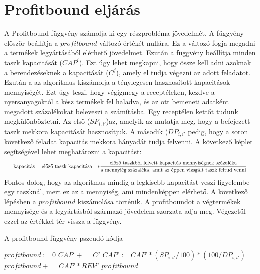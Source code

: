 \section{Profitbound eljárás}
A Profitbound függvény számolja ki egy részprobléma jövedelmét. A függvény először beállítja a $profitbound$ változó értékét nullára. Ez a változó fogja megadni a termékek legyártásából elérhető jövedelmet. Ezután a függvény beállítja minden taszk kapacitását ($CAP^{i}$). Ezt úgy lehet megkapni, hogy össze kell adni azoknak a berendezéseknek a kapacitását ($C^{j}$), amely el tudja végezni az adott feladatot. Ezután a az algoritmus kiszámolja a ténylegesen hasznosított kapacitások mennyiségét. Ezt úgy teszi, hogy végigmegy a receptéleken, kezdve a nyersanyagoktól a kész termékek fel haladva, és az ott bemeneti adatként megadott százalékokat beleveszi a számításba. Egy receptélen kettőt tudunk megkülönböztetni. Az első ($SP_{i,i'}$)az, amelyik az mutatja meg, hogy a befejezett taszk mekkora kapacitását hasznosítjuk. A második ($DP_{i,i'}$ pedig, hogy a soron következő feladat kapacitás mekkora hányadát tudja felvenni. A következő képlet segítségével lehet meghatározni a kapacitást:
\begin{gather}
\scalebox{0.75}{$
\begin{align*}
\text{kapacitás}&= \text{előző taszk kapacitása}&*\frac{\text{előző taszkból felvett kapacitás mennyiségnek százaléka}}{\text{a mennyiég százaléka, amit az éppen vizsgált taszk feltud venni}}
\end{align*}$}	
\end{gather}
Fontos dolog, hogy az algoritmus mindig a legkisebb kapacitást veszi figyelembe egy taszknál, mert ez az a mennyiség, ami mindenképpen elérhető. A következő lépésben a $profitbound$ kiszámolása történik. A profitboundot a végtermékek mennyisége és a legyártásból származó jövedelem szorzata adja meg. Végezetül ezzel az értékkel tér vissza a függvény.

\begin{algorithm}[H]
\caption{A profitbound függvény pszeudó kódja}
\label{profitbound}
\begin{algorithmic}[1]
	\State $profitbound:= 0$
			\State $CAP^{i} \mathrel{+}= C^{j}$			
		\EndFor
	\EndFor
				\State $CAP^{i}:= CAP^{i}*(SP_{i,i'}/100)*(100/DP_{i,i'})$
			\EndIf
		\EndFor	
	\EndFor
				\State $profitbound \mathrel{+}= CAP^{i}*REV^{p}$
			\EndIf
		\EndFor
	\EndFor
	\State \Return $profitbound$
\EndProcedure
\end{algorithmic}
\end{algorithm}